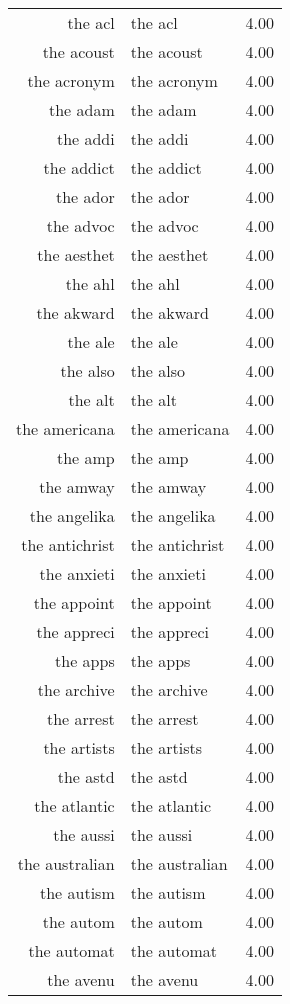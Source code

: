 \begin{table}[ht]
\begin{tabular}{rlr}
  the acl & the acl & 4.00 \\ 
  the acoust & the acoust & 4.00 \\ 
  the acronym & the acronym & 4.00 \\ 
  the adam & the adam & 4.00 \\ 
  the addi & the addi & 4.00 \\ 
  the addict & the addict & 4.00 \\ 
  the ador & the ador & 4.00 \\ 
  the advoc & the advoc & 4.00 \\ 
  the aesthet & the aesthet & 4.00 \\ 
  the ahl & the ahl & 4.00 \\ 
  the akward & the akward & 4.00 \\ 
  the ale & the ale & 4.00 \\ 
  the also & the also & 4.00 \\ 
  the alt & the alt & 4.00 \\ 
  the americana & the americana & 4.00 \\ 
  the amp & the amp & 4.00 \\ 
  the amway & the amway & 4.00 \\ 
  the angelika & the angelika & 4.00 \\ 
  the antichrist & the antichrist & 4.00 \\ 
  the anxieti & the anxieti & 4.00 \\ 
  the appoint & the appoint & 4.00 \\ 
  the appreci & the appreci & 4.00 \\ 
  the apps & the apps & 4.00 \\ 
  the archive & the archive & 4.00 \\ 
  the arrest & the arrest & 4.00 \\ 
  the artists & the artists & 4.00 \\ 
  the astd & the astd & 4.00 \\ 
  the atlantic & the atlantic & 4.00 \\ 
  the aussi & the aussi & 4.00 \\ 
  the australian & the australian & 4.00 \\ 
  the autism & the autism & 4.00 \\ 
  the autom & the autom & 4.00 \\ 
  the automat & the automat & 4.00 \\ 
  the avenu & the avenu & 4.00 \\ 

\end{tabular}
\end{table}
